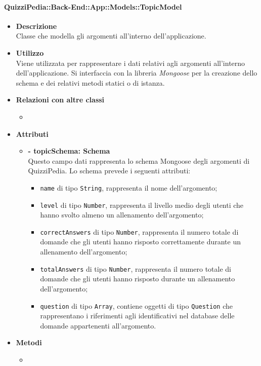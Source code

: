 \paragraph{QuizziPedia::Back-End::App::Models::TopicModel}
\begin{itemize}
	\item \textbf{Descrizione} \\
	Classe che modella gli argomenti all'interno dell'applicazione.
	\item \textbf{Utilizzo} \\
	Viene utilizzata per rappresentare i dati relativi agli argomenti all'interno dell'applicazione. Si interfaccia con la libreria \textit{Mongoose} per la creazione dello schema e dei relativi metodi statici o di istanza.
	\item \textbf{Relazioni con altre classi}
		\begin{itemize}
			\item 
		\end{itemize}
	\item \textbf{Attributi}
		\begin{itemize}
			\item \textbf{- topicSchema: Schema} \\
			Questo campo dati rappresenta lo schema Mongoose degli argomenti di QuizziPedia. Lo schema prevede i seguenti attributi:
				\begin{itemize}
					\item \texttt{name} di tipo \texttt{String}, rappresenta il nome dell'argomento;
					\item \texttt{level} di tipo \texttt{Number}, rappresenta il livello medio degli utenti che hanno svolto almeno un allenamento dell'argomento;
					\item \texttt{correctAnswers} di tipo \texttt{Number}, rappresenta il numero totale di domande che gli utenti hanno risposto correttamente durante un allenamento dell'argomento; 
					\item \texttt{totalAnswers} di tipo \texttt{Number}, rappresenta il numero totale di domande che gli utenti hanno risposto durante un allenamento dell'argomento;
					\item \texttt{question} di tipo \texttt{Array}, contiene oggetti di tipo \texttt{Question} che rappresentano i riferimenti agli identificativi nel database delle domande appartenenti all'argomento.
				\end{itemize}
		\end{itemize}
	\item \textbf{Metodi}
		\begin{itemize}
			\item 
		\end{itemize}
\end{itemize}